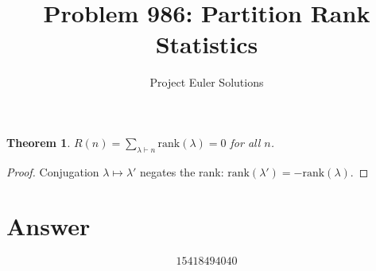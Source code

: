 \documentclass[11pt]{article}
\title{Problem 986: Partition Rank Statistics}
\author{Project Euler Solutions}
\date{}
\newtheorem{theorem}{Theorem}
\begin{document}
\maketitle
\begin{theorem}
$R(n) = \sum_{\lambda \vdash n}\mathrm{rank}(\lambda) = 0$ for all $n$.
\end{theorem}
\begin{proof}
Conjugation $\lambda \mapsto \lambda'$ negates the rank: $\mathrm{rank}(\lambda') = -\mathrm{rank}(\lambda)$.
\end{proof}
\section{Answer}

\[
\boxed{15418494040}
\]
\end{document}
